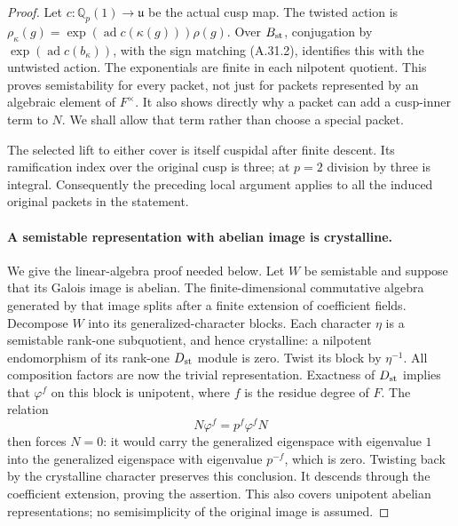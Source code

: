 \begin{proof}
Let \(c:\mathbb Q_p(1)\to\mathfrak u\) be the actual cusp
map. The twisted action is
\(\rho_\kappa(g)=\exp(\operatorname{ad}c(\kappa(g)))\rho(g)\).
Over \(B_{\rm st}\), conjugation by
\(\exp(\operatorname{ad}c(b_\kappa))\), with the sign matching
(A.31.2), identifies this with the untwisted action.
The exponentials are finite in each nilpotent quotient.
This proves semistability for every packet, not just for
packets represented by an algebraic element of \(F^\times\).
It also shows directly why a packet can add a cusp-inner
term to \(N\). We shall allow that term rather than choose
a special packet.

The selected lift to either cover is itself cuspidal after
finite descent. Its ramification index over the original
cusp is three; at \(p=2\) division by three is integral.
Consequently the preceding local argument applies to all
the induced original packets in the statement.

\paragraph{A semistable representation with abelian image is crystalline.}
We give the linear-algebra proof needed below. Let \(W\)
be semistable and suppose that its Galois image is abelian.
The finite-dimensional commutative algebra generated by
that image splits after a finite extension of coefficient
fields. Decompose \(W\) into its generalized-character
blocks. Each character \(\eta\) is a semistable rank-one
subquotient, and hence crystalline: a nilpotent endomorphism
of its rank-one \(D_{\rm st}\) module is zero.
Twist its block by \(\eta^{-1}\). All composition factors
are now the trivial representation. Exactness of
\(D_{\rm st}\) implies that \(\varphi^f\) on this block
is unipotent, where \(f\) is the residue degree of \(F\).
The relation
\[
                       N\varphi^f=p^f\varphi^fN
                                                        \tag{A.31.3}
\]
then forces \(N=0\): it would carry the generalized
eigenspace with eigenvalue \(1\) into the generalized
eigenspace with eigenvalue \(p^{-f}\), which is zero.
Twisting back by the crystalline character preserves
this conclusion. It descends through the coefficient
extension, proving the assertion. This also covers
unipotent abelian representations; no semisimplicity
of the original image is assumed.


\end{proof}
